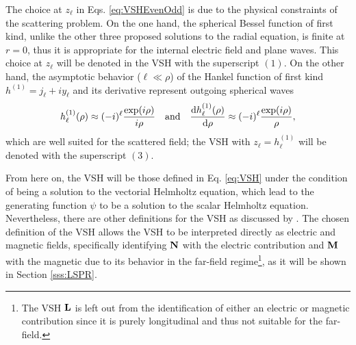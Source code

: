 The choice at $z_\ell$ in Eqs. \eqref{eq:VSHEvenOdd} is due to the physical constraints of the scattering problem. On the one hand, the spherical Bessel function of first kind, unlike the other three proposed solutions to the radial equation, is finite at $r = 0$, thus it is appropriate for the internal electric field and plane waves. This choice at $z_\ell$ will be denoted in the VSH with the superscript $(1)$. On the other hand, the asymptotic behavior ($\ell\ll \rho$) of the Hankel function of first kind $h^{(1)} = j_\ell + i y_\ell$ and its derivative represent outgoing spherical waves \cite{bohren_absorption_1983}
%
%
%
%
%
\begin{align}
	h_\ell^{(1)}(\rho)\approx (-i)^\ell \frac{\exp(i\rho)}{i\rho}
		\qqtext{and}
	\dv{h_\ell^{(1)}(\rho)}{\rho} \approx (-i)^\ell \frac{\exp(i\rho)}{\rho},
\end{align}
which are well suited for the scattered field; the VSH with $z_\ell = h^{(1)}_\ell$ will be denoted with the superscript $(3)$.

From here on, the VSH will be those defined in Eq. \eqref{eq:VSH} under the condition of being a solution to the vectorial Helmholtz equation, which lead to the generating function $\psi$ to be a solution to the scalar Helmholtz equation. Nevertheless, there are other definitions for the VSH as discussed by \citeauthor{barrera_vector_1985} \cite{barrera_vector_1985}. The chosen definition of the VSH allows the VSH to be interpreted directly as electric and magnetic fields, specifically identifying $\vb{N}$ with the electric contribution and $\vb{M}$ with the magnetic due to its behavior in the far-field regime\footnote{The VSH $\vb{L}$ is left out from the identification of either an electric or magnetic contribution since it is purely longitudinal and thus  {not suitable for} the far-field.}, as it will be shown in Section \ref{sss:LSPR}.
